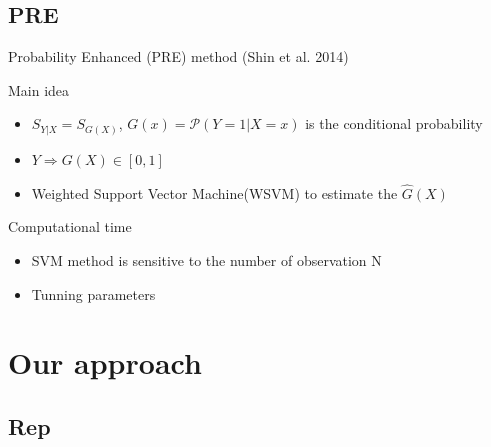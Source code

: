 \documentclass[ignorenonframetext,]{beamer}
\providecommand{\tightlist}{%
  \setlength{\itemsep}{0pt}\setlength{\parskip}{0pt}}
\begin{document}
\subsection{PRE}\label{pre}

\begin{frame}{Probability Enhanced (PRE) method (Shin et al. 2014)}

\begin{block}{Main idea}

\begin{itemize}
\tightlist
\item
  \(S_{Y|X} = S_{G(X)}\), \(G(x) = \mathcal{P}(Y = 1|X = x)\) is the
  conditional probability
\item
  \(Y \Rightarrow G(X) \in [0,1]\)
\item
  Weighted Support Vector Machine(WSVM) to estimate the \(\hat{G}(X)\)
\end{itemize}

\end{block}

\begin{block}{Computational time}

\begin{itemize}
\tightlist
\item
  SVM method is sensitive to the number of observation N
\item
  Tunning parameters
\end{itemize}

\end{block}

\end{frame}

\section{Our approach}\label{our-approach}

\subsection{Rep}\label{rep}
\end{document}
